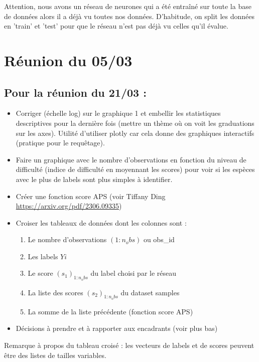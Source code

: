 \documentclass[french]{article}
\begin{document}
\vspace{0.2cm}

Attention, nous avons un réseau de neurones qui a été entraîné sur toute la base de données alors il a déjà vu toutes nos données. D'habitude, on split les données en 'train' et 'test' pour que le réseau n'est pas déjà vu celles qu'il évalue.


\section{Réunion du 05/03}

\subsection{Pour la réunion du 21/03 : }
\begin{itemize}
    \item Corriger (échelle log) sur le graphique 1 et embellir les statistiques descriptives pour la dernière fois (mettre un thème où on voit les graduations sur les axes). Utilité d'utiliser plotly car cela donne des graphiques interactifs (pratique pour le requêtage).
    \item Faire un graphique avec le nombre d'observations en fonction du niveau de difficulté (indice de difficulté en moyennant les scores) pour voir si les espèces avec le plus de labels sont plus simples à identifier.
    \item Créer une fonction score APS (voir Tiffany Ding \url{https://arxiv.org/pdf/2306.09335})
    \item Croiser les tableaux de données dont les colonnes sont :
    \begin{enumerate}
        \item Le nombre d'observations $(1:n_obs)$ ou obs_id
        \item Les labels $Yi$
        \item Le score $(s_1)_{1:n_obs}$ du label choisi par le réseau 
        \item La liste des scores $(s_2)_{1:n_obs}$ du dataset samples 
        \item La somme de la liste précédente (fonction score APS)
    \end{enumerate}
    \item Décisions à prendre et à rapporter aux encadrants (voir plus bas)
\end{itemize}

Remarque à propos du tableau croisé : les vecteurs de labels et de scores peuvent être des listes de tailles variables.
\end{document}
